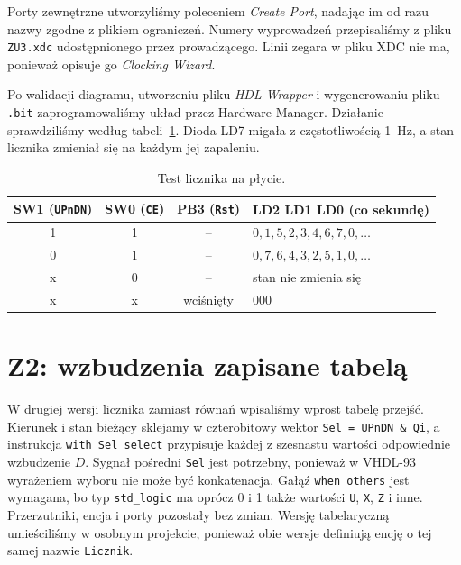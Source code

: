 \documentclass[11pt,a4paper]{article}
\begin{document}
Porty zewnętrzne utworzyliśmy poleceniem \emph{Create Port}, nadając im od razu nazwy zgodne z plikiem ograniczeń. Numery wyprowadzeń przepisaliśmy z pliku \texttt{ZU3.xdc} udostępnionego przez prowadzącego. Linii zegara w pliku XDC nie ma, ponieważ opisuje go \emph{Clocking Wizard}.



Po walidacji diagramu, utworzeniu pliku \emph{HDL Wrapper} i wygenerowaniu pliku \texttt{.bit} zaprogramowaliśmy układ przez Hardware Manager. Działanie sprawdziliśmy według tabeli~\ref{tab:plyta}. Dioda LD7 migała z częstotliwością 1~Hz, a stan licznika zmieniał się na każdym jej zapaleniu.

\begin{table}[H]
\centering
\small
\begin{tabular}{cccl}
\toprule
SW1 (\texttt{UPnDN}) & SW0 (\texttt{CE}) & PB3 (\texttt{Rst}) & LD2 LD1 LD0 (co sekundę)\\
\midrule
1 & 1 & -- & $0, 1, 5, 2, 3, 4, 6, 7, 0, \dots$\\
0 & 1 & -- & $0, 7, 6, 4, 3, 2, 5, 1, 0, \dots$\\
x & 0 & -- & stan nie zmienia się\\
x & x & wciśnięty & 000\\
\bottomrule
\end{tabular}
\caption{Test licznika na płycie.}
\label{tab:plyta}
\end{table}

\section{Z2: wzbudzenia zapisane tabelą}

W drugiej wersji licznika zamiast równań wpisaliśmy wprost tabelę przejść. Kierunek i stan bieżący sklejamy w czterobitowy wektor \texttt{Sel = UPnDN \& Qi}, a instrukcja \texttt{with Sel select} przypisuje każdej z szesnastu wartości odpowiednie wzbudzenie $D$. Sygnał pośredni \texttt{Sel} jest potrzebny, ponieważ w VHDL-93 wyrażeniem wyboru nie może być konkatenacja. Gałąź \texttt{when others} jest wymagana, bo typ \texttt{std\_logic} ma oprócz 0 i 1 także wartości \texttt{U}, \texttt{X}, \texttt{Z} i inne. Przerzutniki, encja i porty pozostały bez zmian. Wersję tabelaryczną umieściliśmy w osobnym projekcie, ponieważ obie wersje definiują encję o tej samej nazwie \texttt{Licznik}.


\end{document}
